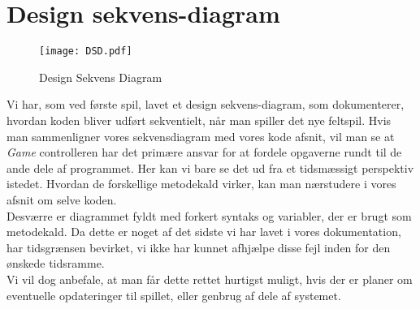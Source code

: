 \section{Design sekvens-diagram}
\begin{figure}[!ht]
\centering
\texttt{[image: DSD.pdf]}
\caption[<Text for the list of figures>]{Design Sekvens Diagram}
\label{fig:figure2}
\end{figure}
\newpage
Vi har, som ved første spil,  lavet et design sekvens-diagram, som dokumenterer, hvordan koden bliver udført sekventielt, når man spiller det nye feltspil. Hvis man sammenligner vores sekvensdiagram med vores kode afsnit, vil man se at \textit{Game} controlleren har det primære ansvar for at fordele opgaverne rundt til de ande dele af programmet. Her kan vi bare se det ud fra et tidsmæssigt perspektiv istedet. Hvordan de forskellige metodekald virker, kan man nærstudere i vores afsnit om selve koden.
\\

Desværre er diagrammet fyldt med forkert syntaks og variabler, der er brugt som metodekald. Da dette er noget af det sidste vi har lavet i vores dokumentation, har tidsgrænsen bevirket, vi ikke har kunnet afhjælpe disse fejl inden for den ønskede tidsramme.
\\
Vi vil dog anbefale, at man får dette rettet hurtigst muligt, hvis der er planer om eventuelle opdateringer til spillet, eller genbrug af dele af systemet.